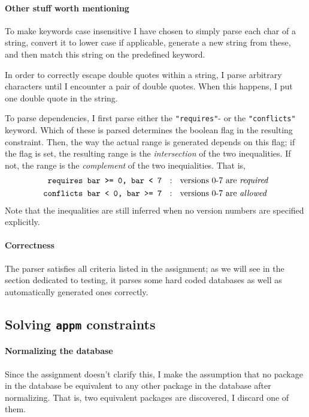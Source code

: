 \paragraph{Other stuff worth mentioning} To make keywords case insensitive I have chosen to simply parse each char of a string, convert it to lower case if applicable, generate a new string from these, and then match this string on the predefined keyword.

In order to correctly escape double quotes within a string, I parse arbitrary characters until I encounter a pair of double quotes. When this happens, I put one double quote in the string.

To parse dependencies, I first parse either the \texttt{"requires"}- or the \texttt{"conflicts"} keyword. Which of these is parsed determines the boolean flag in the resulting constraint. Then, the way the actual range is generated depends on this flag; if the flag is set, the resulting range is the \textit{intersection} of the two inequalities. If not, the range is the \textit{complement} of the two inequialities. That is,
\begin{align*}
  \texttt{requires bar >= 0, bar < 7}  & \ \ : \ \  \text{versions 0-7 are \it required} \\
  \texttt{conflicts bar < 0, bar >= 7} & \ \ : \ \  \text{versions 0-7 are \it allowed}
\end{align*}
Note that the inequalities are still inferred when no version numbers are specified explicitly.

\paragraph{Correctness}
\noindent The parser satisfies all criteria listed in the assignment; as we will see in the section dedicated to testing, it parses some hard coded databases as well as automatically generated ones correctly.


\subsection*{Solving \texttt{appm} constraints}

\paragraph{Normalizing the database}
Since the assignment doesn't clarify this, I make the assumption that no package in the database be equivalent to any other package in the database after normalizing. That is, two equivalent packages are discovered, I discard one of them.


